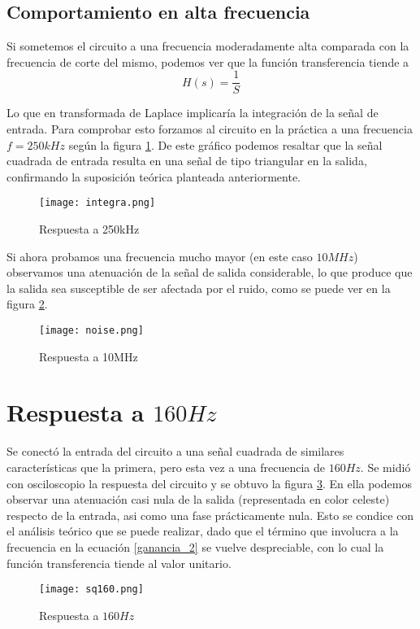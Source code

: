 \subsection{Comportamiento en alta frecuencia}

Si sometemos el circuito a una frecuencia moderadamente alta comparada con la frecuencia de corte del mismo, podemos ver que la funci\'on transferencia tiende a 
\begin{equation}\label{integrador_2}
    H(s)=\frac{1}{S}
\end{equation}

Lo que en transformada de Laplace implicar\'ia la integraci\'on de la se\~nal de entrada. Para comprobar esto forzamos al circuito en la pr\'actica a una frecuencia $f=250kHz$ seg\'un la figura \ref{fig:altafrec_2}. De este gr\'afico podemos resaltar que la se\~nal cuadrada de entrada resulta en una se\~nal de tipo triangular en la salida, confirmando la suposici\'on te\'orica planteada anteriormente.

\begin{figure}[h!]
    \centering
    \texttt{[image: integra.png]}
    \caption{Respuesta a 250kHz}
    \label{fig:altafrec_2} 
\end{figure}

 Si ahora probamos una frecuencia mucho mayor (en este caso $10MHz$) observamos una atenuaci\'on de la se\~nal de salida considerable, lo que produce que la salida sea susceptible de ser afectada por el ruido, como se puede ver en la figura \ref{fig:noise_2}.
 
 \begin{figure}[h!]
    \centering
    \texttt{[image: noise.png]}
    \caption{Respuesta a 10MHz}
    \label{fig:noise_2}
\end{figure}
 
\section{Respuesta a $160Hz$}

Se conect\'o la entrada del circuito a una se\~nal cuadrada de similares caracter\'isticas que la primera, pero esta vez a una frecuencia de $160Hz$. Se midi\'o con osciloscopio la respuesta del circuito y se obtuvo la figura \ref{fig:160hz_2}. En ella podemos observar una atenuaci\'on casi nula de la salida (representada en color celeste) respecto de la entrada, asi como una fase pr\'acticamente nula. Esto se condice con el an\'alisis te\'orico que se puede realizar, dado que el t\'ermino que involucra a la frecuencia en la ecuaci\'on \ref{ganancia_2} se vuelve despreciable, con lo cual la funci\'on transferencia tiende al valor unitario.

\begin{figure}[h!]
    \centering
    \texttt{[image: sq160.png]}
    \caption{Respuesta a $160Hz$}
    \label{fig:160hz_2} 
\end{figure}


